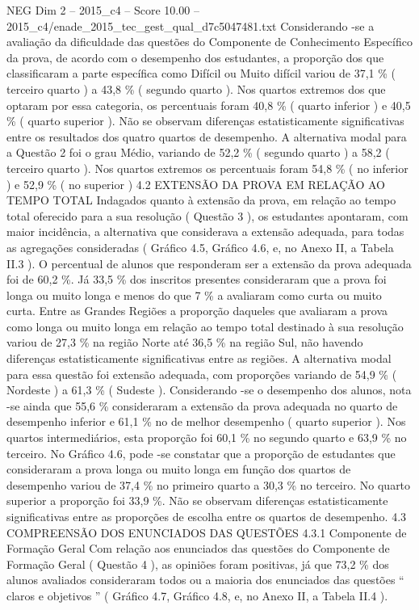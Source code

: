 \begin{textsample}{NEG Dim 2 – 2015\_c4 – Score 10.00 – 2015\_c4/enade\_2015\_tec\_gest\_qual\_d7c5047481.txt}
Considerando -se a avaliação da dificuldade das questões do Componente de Conhecimento Específico da prova, de acordo com o desempenho dos estudantes, a proporção dos que classificaram a parte específica como Difícil ou Muito difícil variou de 37,1 \% ( terceiro quarto ) a 43,8 \% ( segundo quarto ).
Nos quartos extremos dos que optaram por essa categoria, os percentuais foram 40,8 \% ( quarto inferior ) e 40,5 \% ( quarto superior ).
Não se observam diferenças estatisticamente significativas entre os resultados dos quatro quartos de desempenho.
A alternativa modal para a Questão 2 foi o grau Médio, variando de 52,2 \% ( segundo quarto ) a 58,2 ( terceiro quarto ).
Nos quartos extremos os percentuais foram 54,8 \% ( no inferior ) e 52,9 \% ( no superior ) 4.2 EXTENSÃO DA PROVA EM RELAÇÃO AO TEMPO TOTAL Indagados quanto à extensão da prova, em relação ao tempo total oferecido para a sua resolução ( Questão 3 ), os estudantes apontaram, com maior incidência, a alternativa que considerava a extensão adequada, para todas as agregações consideradas ( Gráfico 4.5, Gráfico 4.6, e, no Anexo II, a Tabela II.3 ).
O percentual de alunos que responderam ser a extensão da prova adequada foi de 60,2 \%.
Já 33,5 \% dos inscritos presentes consideraram que a prova foi longa ou muito longa e menos do que 7 \% a avaliaram como curta ou muito curta.
Entre as Grandes Regiões a proporção daqueles que avaliaram a prova como longa ou muito longa em relação ao tempo total destinado à sua resolução variou de 27,3 \% na região Norte até 36,5 \% na região Sul, não havendo diferenças estatisticamente significativas entre as regiões.
A alternativa modal para essa questão foi extensão adequada, com proporções variando de 54,9 \% ( Nordeste ) a 61,3 \% ( Sudeste ).
Considerando -se o desempenho dos alunos, nota -se ainda que 55,6 \% consideraram a extensão da prova adequada no quarto de desempenho inferior e 61,1 \% no de melhor desempenho ( quarto superior ).
Nos quartos intermediários, esta proporção foi 60,1 \% no segundo quarto e 63,9 \% no terceiro.
No Gráfico 4.6, pode -se constatar que a proporção de estudantes que consideraram a prova longa ou muito longa em função dos quartos de desempenho variou de 37,4 \% no primeiro quarto a 30,3 \% no terceiro.
No quarto superior a proporção foi 33,9 \%.
Não se observam diferenças estatisticamente significativas entre as proporções de escolha entre os quartos de desempenho. 4.3 COMPREENSÃO DOS ENUNCIADOS DAS QUESTÕES 4.3.1 Componente de Formação Geral Com relação aos enunciados das questões do Componente de Formação Geral ( Questão 4 ), as opiniões foram positivas, já que 73,2 \% dos alunos avaliados consideraram todos ou a maioria dos enunciados das questões “ claros e objetivos ” ( Gráfico 4.7, Gráfico 4.8, e, no Anexo II, a Tabela II.4 ).

\end{textsample}
